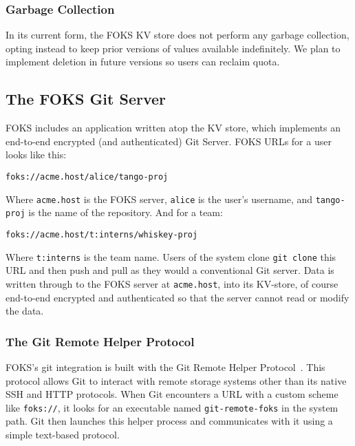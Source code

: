 \subsubsection{Garbage Collection}

In its current form, the FOKS KV store does not perform any garbage collection,
opting instead to keep prior versions of values available indefinitely. We plan
to implement deletion in future versions so users can reclaim quota. 

\subsection{The FOKS Git Server}

FOKS includes an application written atop the KV store, which implements an
end-to-end encrypted (and authenticated) Git Server. FOKS URLs for 
a user looks like this:

\begin{verbatim}
foks://acme.host/alice/tango-proj
\end{verbatim}

Where \texttt{acme.host} is the FOKS server, \texttt{alice} is the user's
username, and \texttt{tango-proj} is the name of the repository. And
for a team:

\begin{verbatim}
foks://acme.host/t:interns/whiskey-proj
\end{verbatim}

Where \texttt{t:interns} is the team name. Users of the system
clone \texttt{git clone} this URL and then push and pull as
they would a conventional Git server. Data is written through to
the FOKS server at \texttt{acme.host}, into its KV-store,
of course end-to-end encrypted and authenticated so that the server
cannot read or modify the data.

\subsubsection{The Git Remote Helper Protocol}

FOKS's git integration is built with the Git Remote Helper 
Protocol~\cite{git-remote-helper}.  This protocol allows Git to interact with
remote storage systems other than its native SSH and HTTP protocols. When Git
encounters a URL with a custom scheme like \texttt{foks://}, it looks for an
executable named \texttt{git-remote-foks} in the system path. Git then launches
this helper process and communicates with it using a simple text-based protocol.

